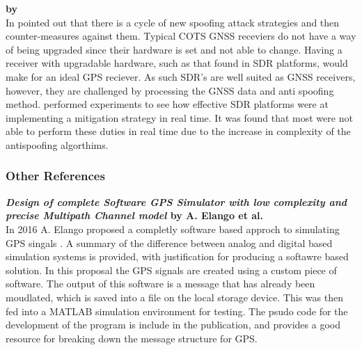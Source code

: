 \medskip

\textbf{\emph{} by \citeauthor{RN18}} \\
In  \citeauthor{RN18} \cite{RN18} pointed out that there is a cycle of new spoofing attack strategies and then counter-measures
against them. Typical COTS GNSS receviers do not have a way of being upgraded since their hardware is set and not able to change. Having a receiver
with upgradable hardware, such as that found in SDR platforms, would make for an ideal GPS reciever. As such SDR's are well suited as GNSS receivers,
however, they are challenged by processing the GNSS data and anti spoofing method. \citeauthor{RN18} performed experiments to see how effective SDR 
platforms were at implementing a mitigation strategy in real time. It was found that most were not able to perform these duties in real time due to the 
increase in complexity of the antispoofing algorthims. 

\medskip

\subsubsection{Other References}

\textbf{\emph{Design of complete Software GPS Simulator with low complexity and precise Multipath Channel model} by A. Elango et al.} \\ 
In 2016 A. Elango proposed a completly software based approch to simulating GPS singals \cite{RN15}. A summary of the difference between analog
and digital based simulation systems is provided, with justification for producing a softawre based solution. In this proposal the GPS signals are created
using a custom piece of software. The output of this software is a message that has already been moudlated, which is saved into a file on the local
storage device. This was then fed into a MATLAB simulation environment for testing. The psudo code for the development of the program is include in
the publication, and provides a good resource for breaking down the message structure for GPS.

\medskip


